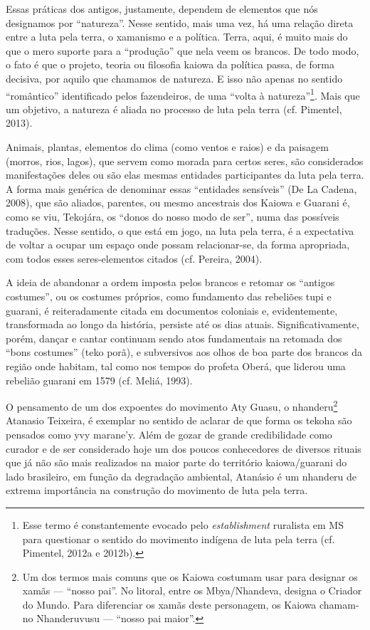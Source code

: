 Essas práticas dos antigos, justamente, dependem de elementos que nós
designamos por ``natureza''. Nesse sentido, mais uma vez, há uma relação
direta entre a luta pela terra, o xamanismo e a política. Terra, aqui,
é muito mais do que o mero suporte para a ``produção'' que nela veem os
brancos. De todo modo, o fato é que o projeto, teoria ou filosofia
kaiowa da política passa, de forma decisiva, por aquilo que chamamos de
natureza. E isso não apenas no sentido ``romântico'' identificado pelos
fazendeiros, de uma ``volta à natureza''\footnote{Esse termo é
constantemente evocado pelo \emph{establishment} ruralista em MS para
questionar o sentido do movimento indígena de luta pela terra (cf.
Pimentel, 2012a e 2012b).}. Mais que um objetivo, a natureza é aliada
no processo de luta pela terra (cf. Pimentel, 2013).

Animais, plantas, elementos do clima (como ventos e raios) e da paisagem
(morros, rios, lagos), que servem como morada para certos seres, são
considerados manifestações deles ou são elas mesmas entidades
participantes da luta pela terra. A forma mais genérica de denominar
essas ``entidades sensíveis'' (De La Cadena, 2008), que são aliados,
parentes, ou mesmo ancestrais dos Kaiowa e Guarani é, como se viu,
Tekojára, os ``donos do nosso modo de ser'', numa das possíveis
traduções. Nesse sentido, o que está em jogo, na luta pela terra, é a
expectativa de voltar a ocupar um espaço onde possam relacionar-se, da
forma apropriada, com todos esses seres-elementos citados (cf. Pereira,
2004).

A ideia de abandonar a ordem imposta pelos brancos e retomar os ``antigos
costumes'', ou os costumes próprios, como fundamento das rebeliões tupi
e guarani, é reiteradamente citada em documentos coloniais e,
evidentemente, transformada ao longo da história, persiste até os dias
atuais. Significativamente, porém, dançar e cantar continuam sendo atos
fundamentais na retomada dos ``bons costumes'' (teko porã), e subversivos
aos olhos de boa parte dos brancos da região onde habitam, tal como nos
tempos do profeta Oberá, que liderou uma rebelião guarani em 1579 (cf.
Meliá, 1993).

O pensamento de um dos expoentes do movimento Aty Guasu, o
nhanderu\footnote{Um dos termos mais comuns que os Kaiowa costumam usar
para designar os xamãs — ``nosso pai''. No litoral, entre os
Mbya/Nhandeva, designa o Criador do Mundo. Para diferenciar os xamãs
deste personagem, os Kaiowa chamam-no Nhanderuvusu — ``nosso pai
maior''.} Atanasio Teixeira, é exemplar no sentido de aclarar de que
forma os tekoha são pensados como yvy marane’y. Além de gozar de grande
credibilidade como curador e de ser considerado hoje um dos poucos
conhecedores de diversos rituais que já não são mais realizados na
maior parte do território kaiowa/guarani do lado brasileiro, em função
da degradação ambiental, Atanásio é um nhanderu de extrema importância
na construção do movimento de luta pela terra. 

